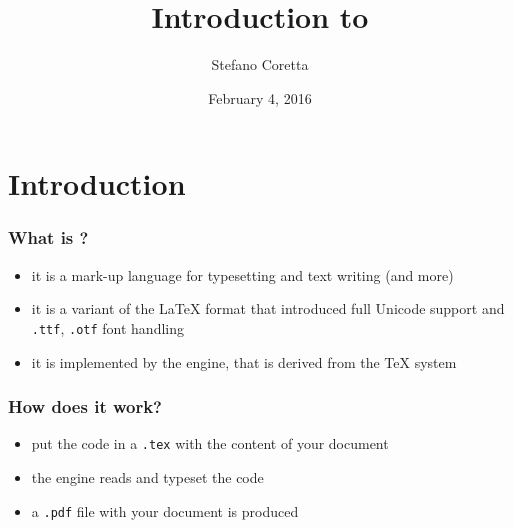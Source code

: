 \documentclass{beamer}
\title{Introduction to \XeLaTeX}
\author{Stefano Coretta}
\date{February 4, 2016}
\begin{document}

\begin{frame}
	\maketitle
\end{frame}




\section{Introduction}


\begin{frame}
	\frametitle{What is \XeLaTeX{}?}
	
\begin{itemize}
\item it is a mark-up language for typesetting and text writing (and more)
\item it is a variant of the \LaTeX{} format that introduced full Unicode support and \texttt{.ttf}, \texttt{.otf} font handling
\item it is implemented by the \XeTeX{} engine, that is derived from the \TeX{} system
\end{itemize}

\end{frame}


\begin{frame}
	\frametitle{How does it work?}
	
\begin{itemize}
\item put the \XeLaTeX{} code in a \texttt{.tex} with the content of your document
\item the \XeTeX{} engine reads and typeset the code
\item a \texttt{.pdf} file with your document is produced
\end{itemize}

\end{frame}

\end{document}
